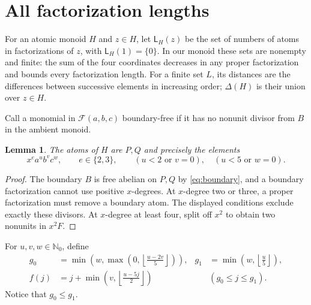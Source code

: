 \documentclass[11pt]{article}
\newtheorem{lemma}[theorem]{Lemma}
\theoremstyle{definition}
\newcommand{\F}{\mathcal F}
\newcommand{\LL}{\mathsf L}
\newcommand{\NN}{\mathbb N_0}
\begin{document}
\section{All factorization lengths}

For an atomic monoid $H$ and $z\in H$, let $\LL_H(z)$ be the set of numbers of atoms in factorizations of $z$, with $\LL_H(1)=\{0\}$. In our monoid these sets are nonempty and finite: the sum of the four coordinates decreases in any proper factorization and bounds every factorization length. For a finite set $L$, its distances are the differences between successive elements in increasing order; $\Delta(H)$ is their union over $z\in H$.

Call a monomial in $\F(a,b,c)$ boundary-free if it has no nonunit divisor from $B$ in the ambient monoid.

\begin{lemma}\label{lem:atoms}
The atoms of $H$ are $P,Q$ and precisely the elements
\[
 x^ea^ub^vc^w,\qquad e\in\{2,3\},\qquad
 (u<2\text{ or }v=0),\quad (u<5\text{ or }w=0).
\]
\end{lemma}
\begin{proof}
The boundary $B$ is free abelian on $P,Q$ by \eqref{eq:boundary}, and a boundary factorization cannot use positive $x$-degrees. At $x$-degree two or three, a proper factorization must remove a boundary atom. The displayed conditions exclude exactly these divisors. At $x$-degree at least four, split off $x^2$ to obtain two nonunits in $x^2F$.
\end{proof}

For $u,v,w\in\NN$, define
\begin{align}
 g_0&=\min\left(w,\max\left(0,\left\lfloor\frac{u-2v}{5}\right\rfloor\right)\right),
 &g_1&=\min\left(w,\left\lfloor\frac u5\right\rfloor\right),\label{eq:cutoffs}\\
 f(j)&=j+\min\left(v,\left\lfloor\frac{u-5j}{2}\right\rfloor\right)
 &&(g_0\leq j\leq g_1).\label{eq:f}
\end{align}
Notice that $g_0\leq g_1$.
\end{document}
